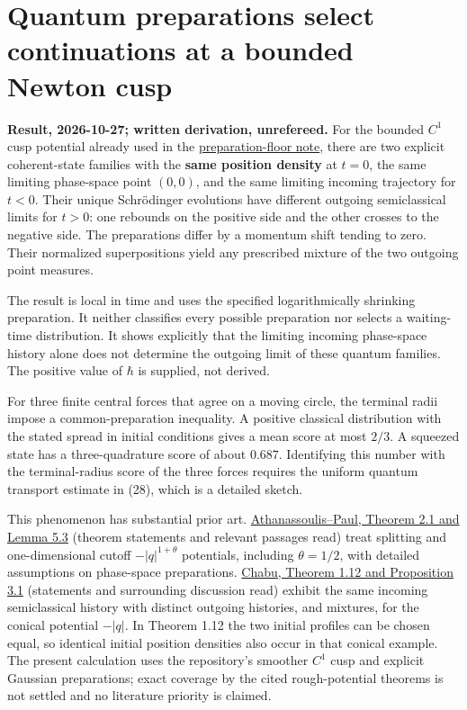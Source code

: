 \documentclass[11pt,a4paper]{article}
\begin{document}
\section{Quantum preparations select continuations at a bounded Newton
cusp}\label{quantum-preparations-select-continuations-at-a-bounded-newton-cusp}

\textbf{Result, 2026-10-27; written derivation, unrefereed.} For the
bounded \(C^1\) cusp potential already used in the
\href{newton-cusp-preparation-floor.md}{preparation-floor note}, there
are two explicit coherent-state families with the \textbf{same position
density} at \(t=0\), the same limiting phase-space point \((0,0)\), and
the same limiting incoming trajectory for \(t<0\). Their unique
Schrödinger evolutions have different outgoing semiclassical limits for
\(t>0\): one rebounds on the positive side and the other crosses to the
negative side. The preparations differ by a momentum shift tending to
zero. Their normalized superpositions yield any prescribed mixture of
the two outgoing point measures.

The result is local in time and uses the specified logarithmically
shrinking preparation. It neither classifies every possible preparation
nor selects a waiting-time distribution. It shows explicitly that the
limiting incoming phase-space history alone does not determine the
outgoing limit of these quantum families. The positive value of
\(\hbar\) is supplied, not derived.

For three finite central forces that agree on a moving circle, the
terminal radii impose a common-preparation inequality. A positive
classical distribution with the stated spread in initial conditions
gives a mean score at most \(2/3\). A squeezed state has a
three-quadrature score of about \(0.687\). Identifying this number with
the terminal-radius score of the three forces requires the uniform
quantum transport estimate in (28), which is a detailed sketch.

This phenomenon has substantial prior art.
\href{https://arxiv.org/pdf/1011.1651}{Athanassoulis--Paul, Theorem 2.1
and Lemma 5.3} (theorem statements and relevant passages read) treat
splitting and one-dimensional cutoff \(-|q|^{1+\theta}\) potentials,
including \(\theta=1/2\), with detailed assumptions on phase-space
preparations. \href{https://arxiv.org/pdf/1608.03716}{Chabu, Theorem
1.12 and Proposition 3.1} (statements and surrounding discussion read)
exhibit the same incoming semiclassical history with distinct outgoing
histories, and mixtures, for the conical potential \(-|q|\). In Theorem
1.12 the two initial profiles can be chosen equal, so identical initial
position densities also occur in that conical example. The present
calculation uses the repository's smoother \(C^1\) cusp and explicit
Gaussian preparations; exact coverage by the cited rough-potential
theorems is not settled and no literature priority is claimed.
\end{document}
